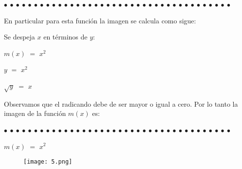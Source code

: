 \documentclass[12pt]{article}
\newenvironment{MyColorPar}[1]{%
    \leavevmode\color{#1}\ignorespaces%
}{%
}%
\begin{document}
\begin{MyColorPar}{Saffron} \bfseries{
 $\bullet$ $\bullet$ $\bullet$ $\bullet$ $\bullet$ $\bullet$ $\bullet$ $\bullet$ $\bullet$ $\bullet$ $\bullet$ $\bullet$ $\bullet$ $\bullet$ $\bullet$ $\bullet$ $\bullet$ $\bullet$ $\bullet$ $\bullet$ $\bullet$ $\bullet$ $\bullet$ $\bullet$ $\bullet$ $\bullet$ $\bullet$ $\bullet$ $\bullet$ $\bullet$ $\bullet$ $\bullet$ $\bullet$ $\bullet$ $\bullet$ $\bullet$ $\bullet$ $\bullet$  }
\end{MyColorPar}

\begin{MyColorPar}{verde_manzana} \bfseries{
{} 
En particular para esta función la imagen se calcula como sigue: \vspace{0.5cm}

Se despeja $x$ en términos de $y$: \vspace{0.5cm}

\hspace{4cm}   $m(x)$ $=$ $x^{2}$  \vspace{0.5cm}

\hspace{4cm}   $y$ $=$ $x^{2}$  \vspace{0.5cm}

\hspace{4cm}   $\sqrt{y}$ $=$ $x$  \vspace{0.5cm}

Observamos que el radicando debe de ser mayor o igual a cero. Por lo tanto la imagen de la función $m(x)$ es: \vspace{0.5cm}

\hspace{3cm} \fbox{$y$ $\in$ [$0$, $\infty$)}} \vspace{0.5cm}

\end{MyColorPar}

\begin{MyColorPar}{Saffron} \bfseries{
 $\bullet$ $\bullet$ $\bullet$ $\bullet$ $\bullet$ $\bullet$ $\bullet$ $\bullet$ $\bullet$ $\bullet$ $\bullet$ $\bullet$ $\bullet$ $\bullet$ $\bullet$ $\bullet$ $\bullet$ $\bullet$ $\bullet$ $\bullet$ $\bullet$ $\bullet$ $\bullet$ $\bullet$ $\bullet$ $\bullet$ $\bullet$ $\bullet$ $\bullet$ $\bullet$ $\bullet$ $\bullet$ $\bullet$ $\bullet$ $\bullet$ $\bullet$ $\bullet$ $\bullet$  }
\end{MyColorPar} \vspace{0.5cm}

\begin{MyColorPar}{verde_manzana} \bfseries{
{}}  \vspace{0.5cm}
\end{MyColorPar}

  $m(x)$ $=$ $x^{2}$  \vspace{0.5cm}
  
    \begin{figure}[htb] \centering

    \texttt{[image: 5.png]} 

\end{figure}
\end{document}
